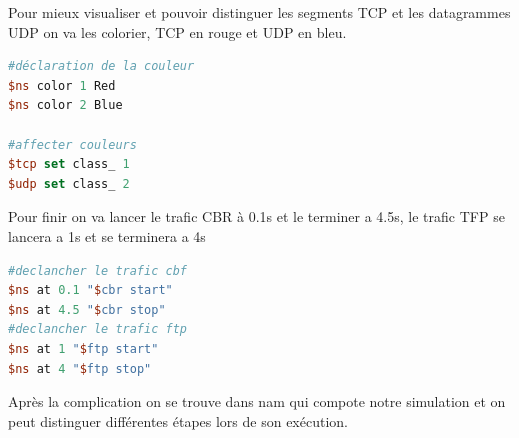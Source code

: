 \documentclass[11pt]{article}
\begin{document}
Pour mieux visualiser et pouvoir distinguer les segments TCP et les datagrammes UDP on va les colorier, TCP en rouge et UDP en bleu.
\begin{lstlisting}[language=tcl, numbers=none, framexleftmargin=0pt, 	framextopmargin=0pt, framexbottommargin=0pt]
#déclaration de la couleur
$ns color 1 Red
$ns color 2 Blue

#affecter couleurs
$tcp set class_ 1
$udp set class_ 2
\end{lstlisting}



Pour finir on va lancer le trafic CBR à 0.1s et le terminer a 4.5s, le trafic TFP se lancera a 1s et se terminera a 4s

\begin{lstlisting}[language=tcl, numbers=none, framexleftmargin=0pt, 	framextopmargin=0pt, framexbottommargin=0pt]
#declancher le trafic cbf
$ns at 0.1 "$cbr start"
$ns at 4.5 "$cbr stop"
#declancher le trafic ftp
$ns at 1 "$ftp start"
$ns at 4 "$ftp stop"
\end{lstlisting}


Après la complication on se trouve dans nam qui compote notre simulation et on peut distinguer différentes étapes lors de son exécution.
\end{document}
